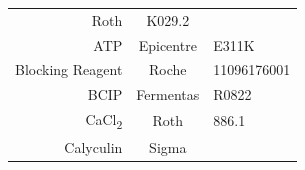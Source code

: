 \documentclass[11pt,singlespacinge,twoside]{reedthesis} %
\theoremstyle{definition}
\theoremstyle{definition}
\theoremstyle{definition}
\theoremstyle{remark}
\begin{document}
\begin{longtable}[]{@{}rcl@{}}
\begin{minipage}[t]{0.33\columnwidth}
Roth\strut
\end{minipage} & \begin{minipage}[t]{0.29\columnwidth}\raggedright
K029.2\strut
\end{minipage}\tabularnewline
\begin{minipage}[t]{0.29\columnwidth}\raggedleft
ATP\strut
\end{minipage} & \begin{minipage}[t]{0.33\columnwidth}\centering
Epicentre\strut
\end{minipage} & \begin{minipage}[t]{0.29\columnwidth}\raggedright
E311K\strut
\end{minipage}\tabularnewline
\begin{minipage}[t]{0.29\columnwidth}\raggedleft
Blocking Reagent\strut
\end{minipage} & \begin{minipage}[t]{0.33\columnwidth}\centering
Roche\strut
\end{minipage} & \begin{minipage}[t]{0.29\columnwidth}\raggedright
11096176001\strut
\end{minipage}\tabularnewline
\begin{minipage}[t]{0.29\columnwidth}\raggedleft
BCIP\strut
\end{minipage} & \begin{minipage}[t]{0.33\columnwidth}\centering
Fermentas\strut
\end{minipage} & \begin{minipage}[t]{0.29\columnwidth}\raggedright
R0822\strut
\end{minipage}\tabularnewline
\begin{minipage}[t]{0.29\columnwidth}\raggedleft
CaCl\textsubscript{2}\strut
\end{minipage} & \begin{minipage}[t]{0.33\columnwidth}\centering
Roth\strut
\end{minipage} & \begin{minipage}[t]{0.29\columnwidth}\raggedright
886.1\strut
\end{minipage}\tabularnewline
\begin{minipage}[t]{0.29\columnwidth}\raggedleft
Calyculin\strut
\end{minipage} & \begin{minipage}[t]{0.33\columnwidth}\centering
Sigma\strut
\end{minipage} & \begin{minipage}[t]{0.29\columnwidth}\raggedright

\end{minipage}
\end{longtable}
\end{document}

